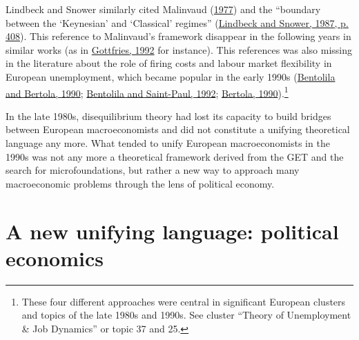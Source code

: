\documentclass[]{elsarticle} %
\begin{document}
Lindbeck and Snower similarly cited Malinvaud
(\protect\hyperlink{ref-malinvaud1977}{1977}) and the ``boundary between
the `Keynesian' and `Classical' regimes''
(\protect\hyperlink{ref-lindbeck1987a}{Lindbeck and Snower, 1987, p.
408}). This reference to Malinvaud's framework disappear in the
following years in similar works (as in
\protect\hyperlink{ref-gottfries1992}{Gottfries, 1992} for instance).
This references was also missing in the literature about the role of
firing costs and labour market flexibility in European unemployment,
which became popular in the early 1990s
(\protect\hyperlink{ref-bentolila1990}{Bentolila and Bertola, 1990};
\protect\hyperlink{ref-bentolila1992a}{Bentolila and Saint-Paul, 1992};
\protect\hyperlink{ref-bertola1990a}{Bertola, 1990}).\footnote{These
  four different approaches were central in significant European
  clusters and topics of the late 1980s and 1990s. See cluster ``Theory
  of Unemployment \& Job Dynamics'' or topic 37 and 25.}

In the late 1980s, disequilibrium theory had lost its capacity to build
bridges between European macroeconomists and did not constitute a
unifying theoretical language any more. What tended to unify European
macroeconomists in the 1990s was not any more a theoretical framework
derived from the GET and the search for microfoundations, but rather a
new way to approach many macroeconomic problems through the lens of
political economy.

\hypertarget{political-economics}{%
\section{A new unifying language: political
economics}\label{political-economics}}
\end{document}
